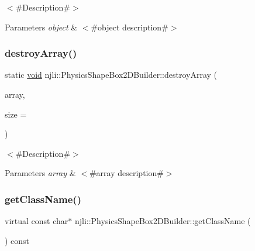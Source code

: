 $<$\#\+Description\#$>$


\begin{DoxyParams}{Parameters}
{\em object} & $<$\#object description\#$>$ \\
\hline
\end{DoxyParams}
\mbox{\label{classnjli_1_1_physics_shape_box2_d_builder_af5d8d7aa9dcb2791a1be28169c206593}} 
\subsubsection{\texorpdfstring{destroy\+Array()}{destroyArray()}}
{\footnotesize\ttfamily static \mbox{\hyperlink{_thread_8h_af1e856da2e658414cb2456cb6f7ebc66}{void}} njli\+::\+Physics\+Shape\+Box2\+D\+Builder\+::destroy\+Array (\begin{DoxyParamCaption}\item[{\mbox{\hyperlink{classnjli_1_1_physics_shape_box2_d_builder}{Physics\+Shape\+Box2\+D\+Builder}} $\ast$$\ast$}]{array,  }\item[{const \mbox{\hyperlink{_util_8h_a10e94b422ef0c20dcdec20d31a1f5049}{u32}}}]{size = {} }\end{DoxyParamCaption})\hspace{0.3cm}{\ttfamily [static]}}

$<$\#\+Description\#$>$


\begin{DoxyParams}{Parameters}
{\em array} & $<$\#array description\#$>$ \\
\hline
\end{DoxyParams}
\mbox{\label{classnjli_1_1_physics_shape_box2_d_builder_ae6471440a74be5d0aaf13df66ee076f2}} 
\subsubsection{\texorpdfstring{get\+Class\+Name()}{getClassName()}}
{\footnotesize\ttfamily virtual const char$\ast$ njli\+::\+Physics\+Shape\+Box2\+D\+Builder\+::get\+Class\+Name (\begin{DoxyParamCaption}{ }\end{DoxyParamCaption}) const\hspace{0.3cm}{\ttfamily [virtual]}}

